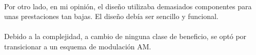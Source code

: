 \paragraph{}
Por otro lado, en mi opinión, el diseño utilizaba demasiados componentes para unas prestaciones tan bajas. El diseño debía ser sencillo y funcional.
\paragraph{}
Debido a la complejidad, a cambio de ninguna clase de beneficio, se opt\'o por transicionar a un esquema de modulaci\'on AM.
